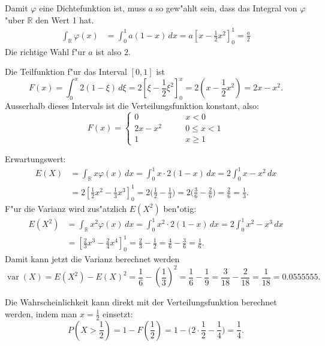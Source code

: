 \begin{loesung}
\begin{teilaufgaben}
\item
Damit $\varphi$ eine Dichtefunktion ist, muss $a$ so gew"ahlt sein,
dass das Integral von $\varphi$ "uber $\mathbb R$ den Wert 1 hat.
\begin{align*}
\int_{\mathbb R}\varphi(x)
&=
\int_{0}^{1}a(1-x)\,dx=a\left[x-\frac12x^2\right]_0^1
=
\frac{a}2
\end{align*}
Die richtige Wahl f"ur $a$ ist also $2$.
\item
Die Teilfunktion f"ur das Interval $[0,1]$ ist
\[
F(x)=\int_{0}^x 2(1-\xi)\,d\xi
=
2\left[\xi - \frac12\xi^2\right]_0^x
=
2(x-\frac12x^2)
=
2x-x^2.
\]
Ausserhalb dieses Intervals ist die Verteilungsfunktion konstant, also:
\[
F(x)=\begin{cases}
0&\qquad x < 0\\
2x-x^2
&\qquad 0 \le x < 1\\
1&\qquad x\ge1
\end{cases}
\]
\item
Erwartungswert:
\begin{align*}
E(X)&=\int_{\mathbb R} x\varphi(x)\,dx
=
\int_0^1x\cdot 2(1-x)\,dx
=
2\int_0^1 x-x^2\,dx
\\
&=
2\left[\frac12x^2-\frac13x^3\right]_0^1
=2\biggl(\frac12-\frac13\biggr)
=2\biggl(\frac3{6}-\frac{2}{6}\biggr)
=\frac2{6}=\frac13.
\end{align*}
F"ur die Varianz wird zus"atzlich $E(X^2)$ ben"otig:
\begin{align*}
E(X^2)
&=
\int_{\mathbb R} x^2\varphi(x)\,dx
=
\int_0^1x^2\cdot 2(1-x)\,dx
=
2\int_0^1 x^2-x^3\,dx
\\
&=\left[\frac23x^3-\frac24x^4\right]_0^1
=\frac23-\frac12=\frac4{6}-\frac{3}{6}=\frac{1}{6}.
\end{align*}
Damit kann jetzt die Varianz berechnet werden
\[
\operatorname{var}(X)=E(X^2)-E(X)^2=\frac{1}{6}-\left(\frac{1}{3}\right)^2
=\frac16-\frac19=\frac3{18}-\frac2{18}
=\frac{1}{18}=0.0555555.
\]
\item
Die Wahrscheinlichkeit kann direkt mit der Verteilungsfunktion
berechnet werden, indem man $x=\frac12$ einsetzt:
\[
P(X>\frac12)
=
1-F(\frac12)=1-\biggl(2\cdot \frac12-\frac14\biggr)=\frac14.
\]
\end{teilaufgaben}
\end{loesung}

